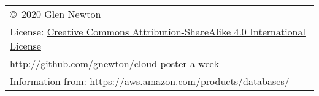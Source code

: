                   \small
                  \begin{tabular}{l}
                  \\
                    \copyright \ 2020 Glen Newton\\
                    License: \href{https://creativecommons.org/licenses/by-sa/4.0/legalcode}{Creative Commons Attribution-ShareAlike 4.0 International License}\\
                    \url{http://github.com/gnewton/cloud-poster-a-week} \\
                    Information from: \url{https://aws.amazon.com/products/databases/}
                  \end{tabular}
